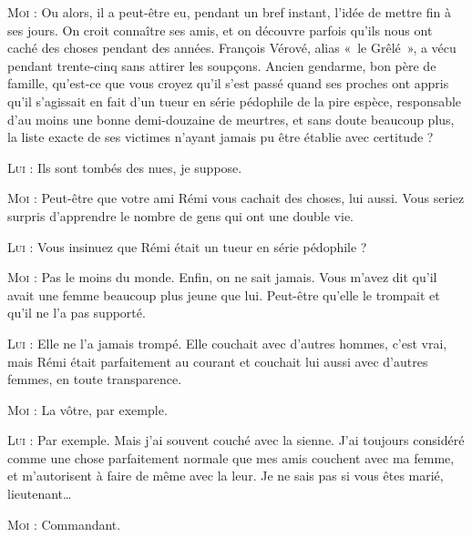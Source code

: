 \begin{dialogue}
\textsc{Moi} : Ou alors, il a peut-être eu, pendant un bref instant, l’idée de mettre fin à ses jours. On croit connaître ses amis, et on découvre parfois qu’ils nous ont caché des choses pendant des années. François Vérové, alias «~le Grêlé~», a vécu pendant trente-cinq sans attirer les soupçons. Ancien gendarme, bon père de famille, qu’est-ce que vous croyez qu’il s’est passé quand ses proches ont appris qu’il s’agissait en fait d’un tueur en série pédophile de la pire espèce, responsable d’au moins une bonne demi-douzaine de meurtres, et sans doute beaucoup plus, la liste exacte de ses victimes n’ayant jamais pu être établie avec certitude ?

\textsc{Lui} : Ils sont tombés des nues, je suppose.

\textsc{Moi} : Peut-être que votre ami Rémi vous cachait des choses, lui aussi. Vous seriez surpris d’apprendre le nombre de gens qui ont une double vie.

\textsc{Lui} : Vous insinuez que Rémi était un tueur en série pédophile ?

\textsc{Moi} : Pas le moins du monde. Enfin, on ne sait jamais. Vous m’avez dit qu’il avait une femme beaucoup plus jeune que lui. Peut-être qu’elle le trompait et qu’il ne l’a pas supporté.

\textsc{Lui} : Elle ne l’a jamais trompé. Elle couchait avec d’autres hommes, c’est vrai, mais Rémi était parfaitement au courant et couchait lui aussi avec d’autres femmes, en toute transparence.

\textsc{Moi} : La vôtre, par exemple.

\textsc{Lui} : Par exemple. Mais j’ai souvent couché avec la sienne. J’ai toujours considéré comme une chose parfaitement normale que mes amis couchent avec ma femme, et m’autorisent à faire de même avec la leur. Je ne sais pas si vous êtes marié, lieutenant…

\textsc{Moi} : Commandant.


\end{dialogue}
